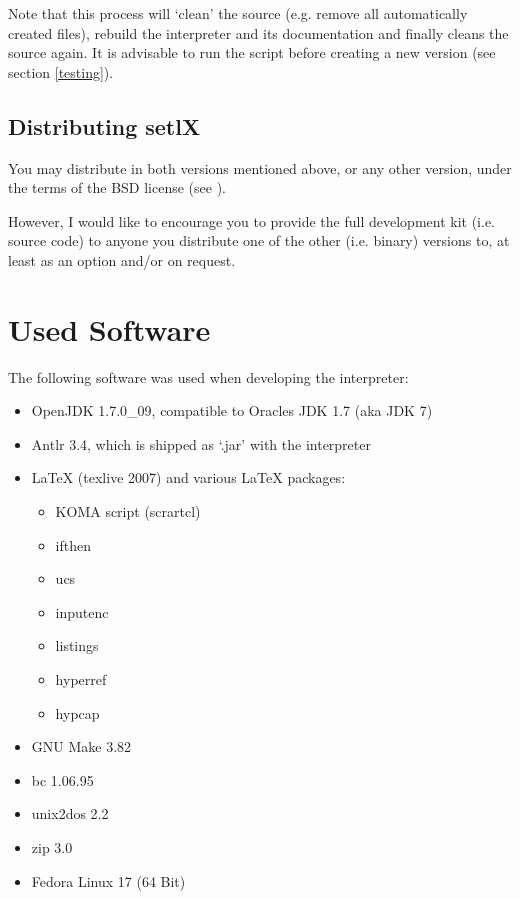 Note that this process will `clean' the source (e.g. remove all automatically created files), rebuild the interpreter and its documentation and finally cleans the source again. It is advisable to run the  script before creating a new version (see section \ref{testing}).

\subsection{Distributing setlX}

You may distribute \setlX{} in both versions mentioned above, or any other version, under the terms of the BSD license (see ).

However, I would like to encourage you to provide the full development kit (i.e. source code) to anyone you distribute one of the other (i.e. binary) versions to, at least as an option and\slash{}or on request.

\section{Used Software}

The following software was used when developing the \setlX{} interpreter:

\begin{itemize}
	\item OpenJDK 1.7.0\_09, compatible to Oracles JDK 1.7 (aka JDK 7)
	\item Antlr 3.4, which is shipped as `.jar' with the interpreter
	\item \LaTeX{} (texlive 2007) and various \LaTeX{} packages:
		\begin{itemize}
			\item KOMA script (scrartcl)
			\item ifthen
			\item ucs
			\item inputenc
			\item listings
			\item hyperref
			\item hypcap
		\end{itemize}
	\item GNU Make 3.82
	\item bc 1.06.95
	\item unix2dos 2.2
	\item zip 3.0
	\item Fedora Linux 17 (64 Bit)
\end{itemize}


